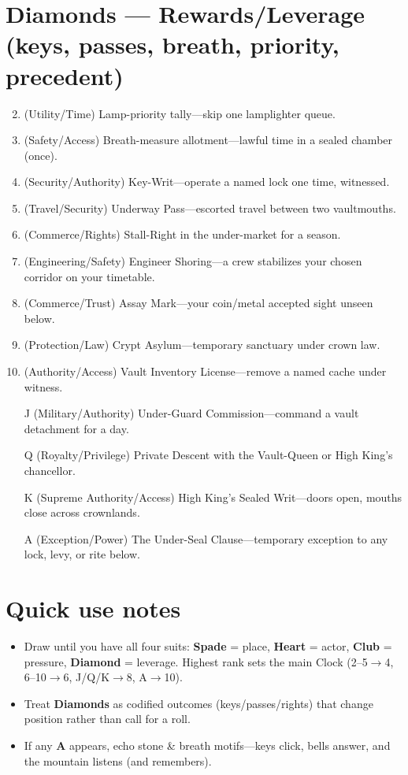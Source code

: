 \section*{Diamonds --- Rewards/Leverage (keys, passes, breath, priority, precedent)}
\label{sec:aeler-rewards}
\begin{enumerate}
\setcounter{enumi}{1}
\item (Utility/Time) Lamp-priority tally---skip one lamplighter queue.
\item (Safety/Access) Breath-measure allotment---lawful time in a sealed chamber (once).
\item (Security/Authority) Key-Writ---operate a named lock one time, witnessed.
\item (Travel/Security) Underway Pass---escorted travel between two vaultmouths.
\item (Commerce/Rights) Stall-Right in the under-market for a season.
\item (Engineering/Safety) Engineer Shoring---a crew stabilizes your chosen corridor on your timetable.
\item (Commerce/Trust) Assay Mark---your coin/metal accepted sight unseen below.
\item (Protection/Law) Crypt Asylum---temporary sanctuary under crown law.
\item (Authority/Access) Vault Inventory License---remove a named cache under witness.
\item[J] (Military/Authority) Under-Guard Commission---command a vault detachment for a day.
\item[Q] (Royalty/Privilege) Private Descent with the Vault-Queen or High King's chancellor.
\item[K] (Supreme Authority/Access) High King's Sealed Writ---doors open, mouths close across crownlands.
\item[A] (Exception/Power) The Under-Seal Clause---temporary exception to any lock, levy, or rite below.
\end{enumerate}

\section*{Quick use notes}
\label{sec:aeler-quick-use}
\begin{itemize}
\item Draw until you have all four suits: \textbf{Spade} = place, \textbf{Heart} = actor, \textbf{Club} = pressure, \textbf{Diamond} = leverage. Highest rank sets the main Clock (2--5$\rightarrow$4, 6--10$\rightarrow$6, J/Q/K$\rightarrow$8, A$\rightarrow$10).
\item Treat \textbf{Diamonds} as codified outcomes (keys/passes/rights) that change position rather than call for a roll.
\item If any \textbf{A} appears, echo stone \& breath motifs---keys click, bells answer, and the mountain listens (and remembers).
\end{itemize}

